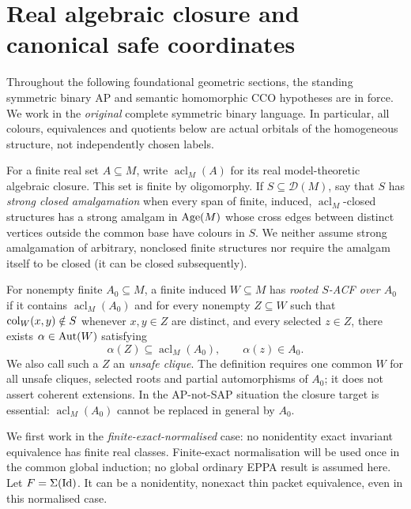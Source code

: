 \section{Real algebraic closure and canonical safe coordinates}
\label{sec:acf-geometry}

Throughout the following foundational geometric sections, the standing
symmetric binary AP and semantic homomorphic CCO hypotheses are in force.  We work in the
\emph{original} complete symmetric binary language.  In particular, all
colours, equivalences and quotients below are actual orbitals of the
homogeneous structure, not independently chosen labels.

For a finite real set \(A\subseteq M\), write
\(\operatorname{acl}_M(A)\) for its real model-theoretic algebraic
closure.  This set is finite by oligomorphy.  If \(S\subseteq
\mathcal D(M)\), say that \(S\) has \emph{strong closed amalgamation}
when every span of finite, induced, \(\operatorname{acl}_M\)-closed
structures has a strong amalgam in \(\operatorname{Age}(M)\) whose cross edges
between distinct vertices outside the common base have colours
in \(S\).  We neither assume strong amalgamation of arbitrary,
nonclosed finite structures nor require the amalgam itself to be
closed (it can be closed subsequently).

\begin{definition}
\label{def:rooted-acf}
For nonempty finite \(A_0\subseteq M\), a finite induced
\(W\subseteq M\) has \emph{rooted \(S\)-ACF over \(A_0\)} if it
contains \(\operatorname{acl}_M(A_0)\) and for every nonempty
\(Z\subseteq W\) such that
\(\operatorname{col}_W(x,y)\notin S\) whenever \(x,y\in Z\) are distinct,
and every selected \(z\in Z\), there exists
\(\alpha\in\operatorname{Aut}(W)\) satisfying
\[
 \alpha(Z)\subseteq\operatorname{acl}_M(A_0),
 \qquad \alpha(z)\in A_0.
\]
We also call such a \(Z\) an \emph{unsafe clique}.  The definition
requires one common \(W\) for all unsafe cliques, selected roots
and partial automorphisms of \(A_0\); it does not assert coherent
extensions.  In the AP-not-SAP situation the closure target is
essential: \(\operatorname{acl}_M(A_0)\) cannot be replaced in
general by \(A_0\).
\end{definition}

We first work in the \emph{finite-exact-normalised} case: no
nonidentity exact invariant equivalence has finite real classes.
Finite-exact normalisation will be used once in the common global
induction; no global ordinary EPPA result is assumed here.  Let \(F=\Sigma(\mathrm{Id})\).  It can be a nonidentity, nonexact
thin packet equivalence, even in this normalised case.


